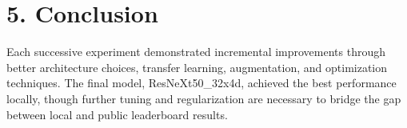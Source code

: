 \documentclass{article}
\begin{document}
\section*{5. Conclusion}

Each successive experiment demonstrated incremental improvements through better architecture choices, transfer learning, augmentation, and optimization techniques. The final model, ResNeXt50\_32x4d, achieved the best performance locally, though further tuning and regularization are necessary to bridge the gap between local and public leaderboard results.
\end{document}
